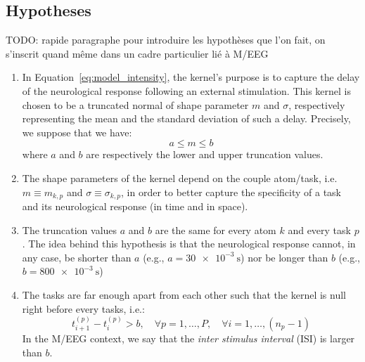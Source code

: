 \subsection{Hypotheses}

TODO: rapide paragraphe pour introduire les hypothèses que l'on fait, on s'inscrit quand même dans un cadre particulier lié à M/EEG

\begin{enumerate}
    \item In Equation~\eqref{eq:model_intensity}, the kernel's purpose is to capture the delay of the neurological response following an external stimulation.
    This kernel is chosen to be a truncated normal of shape parameter $m$ and $\sigma$, respectively representing the mean and the standard deviation of such a delay.
    Precisely, we suppose that we have:
    \begin{equation}\label{eq:m_in_between}
        a \leq m \leq b
    \end{equation}
    where $a$ and $b$ are respectively the lower and upper truncation values.
    
    \item The shape parameters of the kernel depend on the couple atom/task, i.e. $m\equiv m_{k,p}$ and $\sigma \equiv \sigma_{k,p}$, in order to better capture the specificity of a task and its neurological response (in time and in space).
    
    \item The truncation values $a$ and $b$ are the same for every atom $k$ and every task $p$.
    The idea behind this hypothesis is that the neurological response cannot, in any case, be shorter than $a$ (e.g., $a = \SI{30e-3}{\second}$) nor be longer than $b$ (e.g., $b = \SI{800e-3}{\second}$)
    
    \item The tasks are far enough apart from each other such that the kernel is null right before every tasks, i.e.:
    \begin{equation}\label{eq:separated_timestamps}
        t_{i+1}^{(p)} - t_i^{(p)} > b, \quad \forall p=1,\dots,P, \quad \forall i=1,\dots, (n_p-1)
    \end{equation}
    In the M/EEG context, we say that the \textit{inter stimulus interval} (ISI) is larger than $b$.
    

\end{enumerate}

